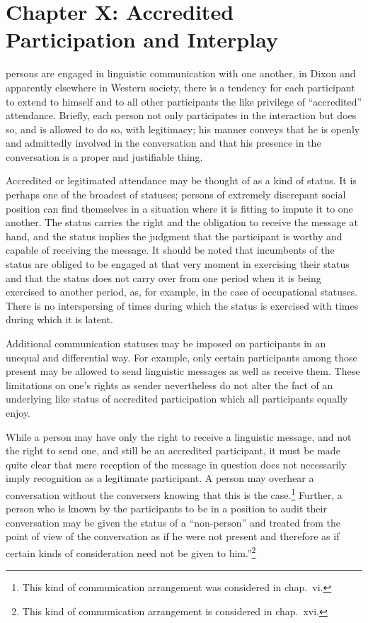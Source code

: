 \documentclass[openany,nobib]{tufte-book}
\let\oldchapter\chapter
\def\chapter{%
  \setcounter{footnote}{0}%
  \oldchapter
}
\begin{document}
\chapter[CHAPTER X: ACCREDITED PARTICIPATION AND INTERPLAY]{Chapter X: Accredited Participation and Interplay}
\label{ch:Chapter X: Accredited Participation and Interplay}

persons are engaged in linguistic communication with
one another, in Dixon and apparently elsewhere in Western society, there
is a tendency for each participant to extend to himself and to all other
participants the like privilege of ``accredited'' attendance. Briefly,
each person not only participates in the interaction but does so, and is
allowed to do so, with legitimacy; his manner conveys that he is openly
and admittedly involved in the conversation and that his presence in the
conversation is a proper and justifiable thing.

Accredited or legitimated attendance may be thought of as a kind of
status. It is perhaps one of the broadest of statuses; persons of
extremely discrepant social position can find themselves in a situation
where it is fitting to impute it to one another. The status carries the
right and the obligation to receive the message at hand, and the status
implies the judgment that the participant is worthy and capable of
receiving the message. It should be noted that incumbents of the status
are obliged to be engaged at that very moment in exercising their status
and that the status does not carry over from one period when it is being
exercised to another period, as, for example, in the case of
occupational statuses. There is no interspersing of times during which
the status is exercised with times during which it is latent.

Additional communication statuses may be imposed on participants in an
unequal and differential way. For example, only certain participants
among those present may be allowed to send linguistic messages as well
as receive them. These limitations on one's rights as sender
nevertheless do not alter the fact of an underlying like status of
accredited participation which all participants equally enjoy.

While a person may have only the right to receive a linguistic message,
and not the right to send one, and still be an accredited participant,
it must be made quite clear that mere reception of the message in
question does not necessarily imply recognition as a legitimate
participant. A person may overhear a conversation without the conversers
knowing that this is the case.\footnote{This kind of communication
  arrangement was considered in chap.~vi.} Further, a person who is
known by the participants to be in a position to audit their
conversation may be given the status of a ``non-person'' and treated
from the point of view of the conversation as if he were not present and
therefore as if certain kinds of consideration need not be given to
him.''\footnote{This kind of communication arrangement is considered in
  chap.~xvi.}
\end{document}
